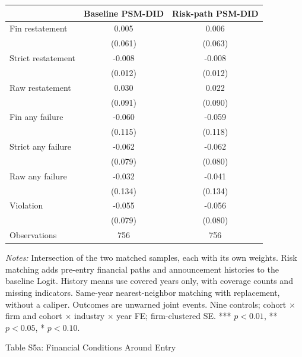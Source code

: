\documentclass[10pt]{article}
\begin{document}
\begin{tabular*}{\textwidth}{@{\extracolsep{\fill}}lcc@{}}
\toprule
 & Baseline PSM-DID & Risk-path PSM-DID \\
\midrule
Fin restatement & 0.005 & 0.006 \\
 & (0.061) & (0.063) \\
Strict restatement & -0.008 & -0.008 \\
 & (0.012) & (0.012) \\
Raw restatement & 0.030 & 0.022 \\
 & (0.091) & (0.090) \\
Fin any failure & -0.060 & -0.059 \\
 & (0.115) & (0.118) \\
Strict any failure & -0.062 & -0.062 \\
 & (0.079) & (0.080) \\
Raw any failure & -0.032 & -0.041 \\
 & (0.134) & (0.134) \\
Violation & -0.055 & -0.056 \\
 & (0.079) & (0.080) \\
\midrule
Observations & 756 & 756 \\
\bottomrule\end{tabular*}
\medskip\par\fontsize{9}{11}\selectfont
\textit{Notes:} Intersection of the two matched samples, each with its own weights. Risk matching adds pre-entry financial paths and announcement histories to the baseline Logit. History means use covered years only, with coverage counts and missing indicators. Same-year nearest-neighbor matching with replacement, without a caliper. Outcomes are unwarned joint events. Nine controls; cohort $\times$ firm and cohort $\times$ industry $\times$ year FE; firm-clustered SE. *** $p<0.01$, ** $p<0.05$, * $p<0.10$.
\par\fontsize{10}{12}\selectfont
\clearpage
\begin{center}\large Table S5a: Financial Conditions Around Entry\end{center}
\end{document}
